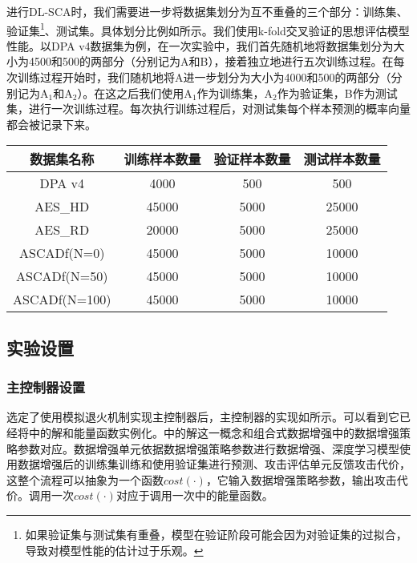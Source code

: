 {	进行DL-SCA时，我们需要进一步将数据集划分为互不重叠的三个部分：训练集、验证集\footnote{如果验证集与测试集有重叠，模型在验证阶段可能会因为对验证集的过拟合，导致对模型性能的估计过于乐观。}、测试集。具体划分比例如所示。我们使用k-fold交叉验证的思想评估模型性能。以DPA v4数据集为例，在一次实验中，我们首先随机地将数据集划分为大小为4500和500的两部分（分别记为A和B），接着独立地进行五次训练过程。在每次训练过程开始时，我们随机地将A进一步划分为大小为4000和500的两部分（分别记为A$_1$和A$_2$）。在这之后我们使用A$_1$作为训练集，A$_2$作为验证集，B作为测试集，进行一次训练过程。每次执行训练过程后，对测试集每个样本预测的概率向量都会被记录下来。%
	\begin{table}[!h]
		\label{tab:partition}
		\centering
		\begin{tabular}{c|ccc}
			\hline
			数据集名称&训练样本数量&验证样本数量&测试样本数量\\
			\hline
			DPA v4    &4000 &500 &500\\
			AES\_HD   &45000&5000&25000\\
			AES\_RD   &20000&5000&25000\\
			ASCADf(N=0)&45000&5000&10000\\
			ASCADf(N=50)&45000&5000&10000\\
			ASCADf(N=100)&45000&5000&10000\\
			\hline
		\end{tabular}
	\end{table}
	\subsection{实验设置}
	\subsubsection{主控制器设置}\label{subss:controllersettings}
	选定了使用模拟退火机制实现主控制器后，主控制器的实现如所示。可以看到它已经将中的解和能量函数实例化。中的解这一概念和组合式数据增强中的数据增强策略参数对应。数据增强单元依据数据增强策略参数进行数据增强、深度学习模型使用数据增强后的训练集训练和使用验证集进行预测、攻击评估单元反馈攻击代价，这整个流程可以抽象为一个函数$cost(\cdot)$，它输入数据增强策略参数，输出攻击代价。调用一次$cost(\cdot)$对应于调用一次中的能量函数。
	
}

